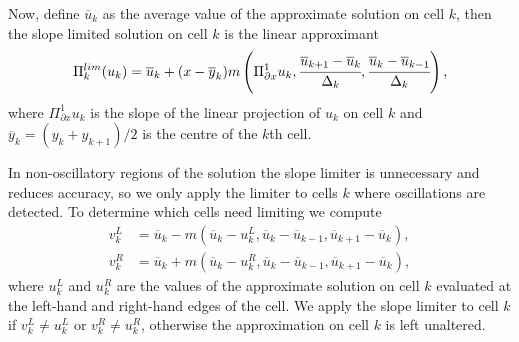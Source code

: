 Now, define \(\overline u_{k}\) as the average value of the approximate solution on cell \(k\), then the slope limited solution on cell \(k\) is the linear approximant 
\begin{align*}
	\Pi_{k}^{lim}(u_k)=\overline u_{k} + (x-\overline y_k)m\left(\Pi^1_{\partial x}u_k,\cfrac{\overline u_{k+1}-\overline u_{k}}{\Delta_k},\cfrac{\overline u_{k}-\overline u_{k-1}}{\Delta_k}\right),
\end{align*}
where \(\Pi^1_{\partial x}u_k\) is the slope of the linear projection of \(u_k\) on cell \(k\) and \(\overline y_k=(y_k+y_{k+1})/2\) is the centre of the \(k\)th cell. 

In non-oscillatory regions of the solution the slope limiter is unnecessary and reduces accuracy, so we only apply the limiter to cells \(k\) where oscillations are detected. To determine which cells need limiting we compute 
\begin{align*}
	v_k^L &= \overline{u}_{k} - m(\overline{u}_{k} - {u}_{k}^L,\overline{u}_{k}-\overline{u}_{k-1},\overline{u}_{k+1}-\overline{u}_{k}),
	\\v_k^R &= \overline{u}_{k} + m(\overline{u}_{k} - {u}_{k}^R,\overline{u}_{k}-\overline{u}_{k-1},\overline{u}_{k+1}-\overline{u}_{k}),
\end{align*}
where \({u}_{k}^L\) and \({u}_{k}^R\) are the values of the approximate solution on cell \(k\) evaluated at the left-hand and right-hand edges of the cell. We apply the slope limiter to cell \(k\) if \(v_k^L\neq u_k^L\) or \(v_k^R\neq u_k^R\), otherwise the approximation on cell \(k\) is left unaltered. 



